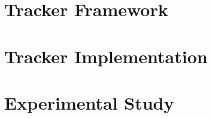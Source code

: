 

\section{Tracker Framework}
\label{fs-acker-tracker}


\section{Tracker Implementation}
\label {fs-acker-impl}


\section{Experimental Study}
\label{fs-experiments}
